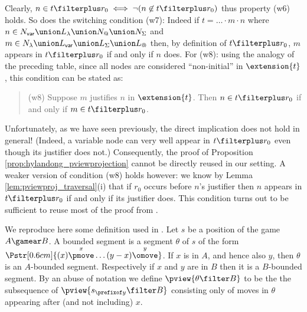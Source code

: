 Clearly, $n \in t\filterplus r_0 \iff \neg ( n \not\in t\filterplus
r_0)$ thus property (w6) holds. So does the switching condition
(w7): Indeed if $t = \ldots \cdot m \cdot n$ where $n\in N_{\sf
var} \union L_\lambda \union N_@ \union N_\Sigma$ and $m \in
N_\lambda \union L_{\sf var} \union L_\Sigma \union L_@$ then, by definition of $t\filterplus r_0$, $m$ appears in $t\filterplus r_0$ if and only if $n$ does. For (w8): using the analogy of the preceding table, since all nodes are considered ``non-initial'' in
$\extension{t}$, this condition can be stated as:
\begin{quote}
 (w8) Suppose $m$ justifies $n$ in $\extension{t}$. Then $n \in t\filterplus r_0$ if and only if $m\in t\filterplus r_0$.
\end{quote}
Unfortunately, as we have seen previously, the direct implication
does not hold in general! (Indeed, a variable node can very well
appear in $t\filterplus r_0$ even though its justifier does not.)
Consequently, the proof of Proposition
\ref{prop:hylandong_pviewprojection} cannot be directly reused in
our setting. A weaker version of condition (w8) holds however: we
know by Lemma \ref{lem:pviewproj_traversal}(i) that if $r_0$
occurs before $n$'s justifier then $n$ appears in $t\filterplus r_0$
if and only if its justifier does. This condition turns out to be
sufficient to reuse most of the proof from \cite{hylandong_pcf}.

We reproduce here some definition used in \cite{hylandong_pcf}. Let
$s$ be a position of the game $A\gamear B$. A bounded segment is
a segment $\theta$ of $s$ of the form
$\Pstr[0.6cm]{(x){\stackrel{x}\pmove} \ldots
(y-x){\stackrel{y}\omove}}$. If $x$ is in $A$, and hence also $y$,
then $\theta$ is an $A$-bounded segment. Respectively if $x$ and $y$
are in $B$ then it is a $B$-bounded segment. By an abuse of notation
we define $\pview{\theta \filter B}$ to be the the subsequence of
$\pview{s_{\prefixof y} \filter B}$ consisting only of moves in
$\theta$ appearing after (and not including) $x$.

